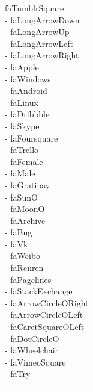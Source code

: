 \documentclass[%
               doublesided,
               paper=a4,
               fontsize=10pt
              ]{my-resume}
\begin{document}
faTumblrSquare\\ \faLongArrowDown - faLongArrowDown\\ \faLongArrowUp - faLongArrowUp\\ \faLongArrowLeft - faLongArrowLeft\\ \faLongArrowRight - faLongArrowRight\\ \faApple - faApple\\ \faWindows - faWindows\\ \faAndroid - faAndroid\\ \faLinux - faLinux\\ \faDribbble - faDribbble\\ \faSkype - faSkype\\ \faFoursquare - faFoursquare\\ \faTrello - faTrello\\ \faFemale - faFemale\\ \faMale - faMale\\ \faGratipay - faGratipay\\ \faSunO - faSunO\\ \faMoonO - faMoonO\\ \faArchive - faArchive\\ \faBug - faBug\\ \faVk - faVk\\ \faWeibo - faWeibo\\ \faRenren - faRenren\\ \faPagelines - faPagelines\\ \faStackExchange - faStackExchange\\ \faArrowCircleORight - faArrowCircleORight\\ \faArrowCircleOLeft - faArrowCircleOLeft\\ \faCaretSquareOLeft - faCaretSquareOLeft\\ \faDotCircleO - faDotCircleO\\ \faWheelchair - faWheelchair\\ \faVimeoSquare - faVimeoSquare\\ \faTry - faTry\\ \faPlusSquareO - 
\end{document}
